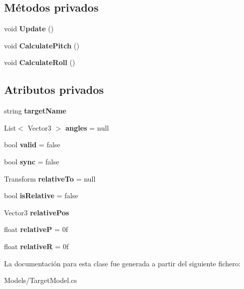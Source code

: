 \subsection*{Métodos privados}
\begin{DoxyCompactItemize}
\item 
\mbox{\label{class_target_model_a3f4e6335f6df91b239a666f0a77dcc63}} 
void {\bfseries Update} ()
\item 
\mbox{\label{class_target_model_aa46b3a43a11a77e303ca082c8d29b998}} 
void {\bfseries Calculate\+Pitch} ()
\item 
\mbox{\label{class_target_model_a503c190ab713118b3eb98569c645f4a1}} 
void {\bfseries Calculate\+Roll} ()
\end{DoxyCompactItemize}
\subsection*{Atributos privados}
\begin{DoxyCompactItemize}
\item 
\mbox{\label{class_target_model_ad39f2812ca757034729ee54cc698c7b3}} 
string {\bfseries target\+Name}
\item 
\mbox{\label{class_target_model_aed1d3dfd19b09d0ae63247970aae763e}} 
List$<$ Vector3 $>$ {\bfseries angles} = null
\item 
\mbox{\label{class_target_model_a5d37f6535e6af5e8dced516c6a1bc367}} 
bool {\bfseries valid} = false
\item 
\mbox{\label{class_target_model_a12786d9135a98fbd760adeb6d571f208}} 
bool {\bfseries sync} = false
\item 
\mbox{\label{class_target_model_ab957d826eb319ac7f3904da281c2f692}} 
Transform {\bfseries relative\+To} = null
\item 
\mbox{\label{class_target_model_a4a1ab5fff50028b528d5bddcbabc7ba2}} 
bool {\bfseries is\+Relative} = false
\item 
\mbox{\label{class_target_model_a8a4b690e49a90f5643c08cea9e2e8323}} 
Vector3 {\bfseries relative\+Pos}
\item 
\mbox{\label{class_target_model_a057eb4a9bd9c55f4ec7f960c90de1e4e}} 
float {\bfseries relativeP} = 0f
\item 
\mbox{\label{class_target_model_ae4903e7f65af91fda7c428f04953fb6a}} 
float {\bfseries relativeR} = 0f
\end{DoxyCompactItemize}


La documentación para esta clase fue generada a partir del siguiente fichero\+:\begin{DoxyCompactItemize}
\item 
Models/Target\+Model.\+cs\end{DoxyCompactItemize}
